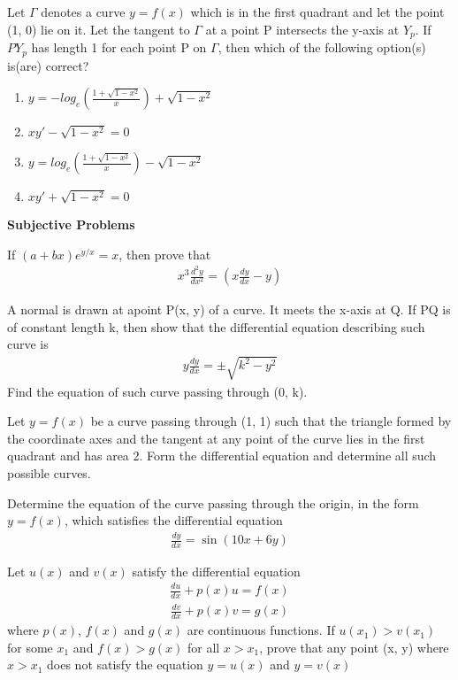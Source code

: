 \item Let $\Gamma$ denotes a curve $y = f(x)$ which is in the first quadrant and let the point (1, 0) lie on it. Let the tangent to $\Gamma$ at a point P intersects the y-axis at $Y_p$. If $PY_p$ has length 1 for each point P on $\Gamma$, then which of the following option(s) is(are) correct?
\begin{enumerate}
\item $y = -log_e\left(\frac{1 + \sqrt{1 - x^2}}{x}\right) + \sqrt{1 - x^2}$
\item $xy' - \sqrt{1 - x^2} = 0$
\item $y = log_e\left(\frac{1 + \sqrt{1 - x^2}}{x}\right) - \sqrt{1 - x^2}$
\item $xy' + \sqrt{1 - x^2} = 0$
\end{enumerate} 

\textbf{Subjective Problems}

\item If $(a + bx)e^{y/x} = x$, then prove that
\begin{align*}
x^3\frac{d^{2}y}{dx^{2}} = \left(x\frac{dy}{dx} - y\right)
\end{align*}

\item A normal is drawn at apoint P(x, y) of a curve. It meets the x-axis at Q. If PQ is of constant length k, then show that the differential equation describing such curve is
\begin{align*}
y \frac{dy}{dx} = \pm \sqrt{k^2 - y^2}
\end{align*}
Find the equation of such curve passing through (0, k).

\item Let $y = f(x)$ be a curve passing through (1, 1) such that the triangle formed by the coordinate axes and the tangent at any point of the curve lies in the first quadrant and has area 2. Form the differential equation and determine all such possible curves.

\item Determine the equation of the curve passing through the origin, in the form $y = f(x)$, which satisfies the differential equation
\begin{align*}
\frac{dy}{dx} = \sin(10x+ 6y)
\end{align*}

\item Let $u(x)$ and $v(x)$ satisfy the differential equation
\begin{align*}
\frac{du}{dx} + p(x)u = f(x)
\end{align*}
\begin{align*}
\frac{dv}{dx} + p(x)v = g(x)
\end{align*}
where $p(x)$, $f(x)$ and $g(x)$ are continuous functions. If $u(x_1) > v(x_1)$ for some $x_1$ and $f(x) > g(x)$ for all $x > x_1$, prove that any point (x, y) where $x > x_1$ does not satisfy the equation $y = u(x)$ and $y = v(x)$ 


